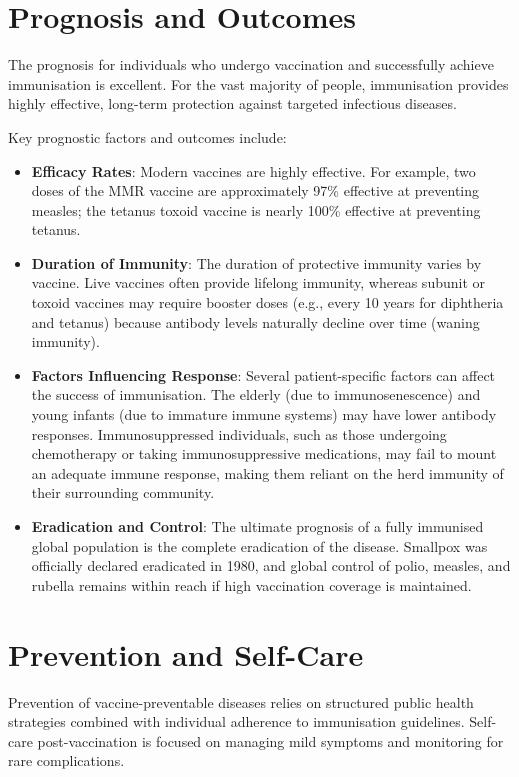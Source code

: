 \section*{Prognosis and Outcomes}
The prognosis for individuals who undergo vaccination and successfully achieve immunisation is excellent. For the vast majority of people, immunisation provides highly effective, long-term protection against targeted infectious diseases.

Key prognostic factors and outcomes include:
\begin{itemize}
    \item \textbf{Efficacy Rates}: Modern vaccines are highly effective. For example, two doses of the MMR vaccine are approximately 97\% effective at preventing measles; the tetanus toxoid vaccine is nearly 100\% effective at preventing tetanus.
    \item \textbf{Duration of Immunity}: The duration of protective immunity varies by vaccine. Live vaccines often provide lifelong immunity, whereas subunit or toxoid vaccines may require booster doses (e.g., every 10 years for diphtheria and tetanus) because antibody levels naturally decline over time (waning immunity).
    \item \textbf{Factors Influencing Response}: Several patient-specific factors can affect the success of immunisation. The elderly (due to immunosenescence) and young infants (due to immature immune systems) may have lower antibody responses. Immunosuppressed individuals, such as those undergoing chemotherapy or taking immunosuppressive medications, may fail to mount an adequate immune response, making them reliant on the herd immunity of their surrounding community.
    \item \textbf{Eradication and Control}: The ultimate prognosis of a fully immunised global population is the complete eradication of the disease. Smallpox was officially declared eradicated in 1980, and global control of polio, measles, and rubella remains within reach if high vaccination coverage is maintained.
\end{itemize}

\section*{Prevention and Self-Care}
Prevention of vaccine-preventable diseases relies on structured public health strategies combined with individual adherence to immunisation guidelines. Self-care post-vaccination is focused on managing mild symptoms and monitoring for rare complications.

